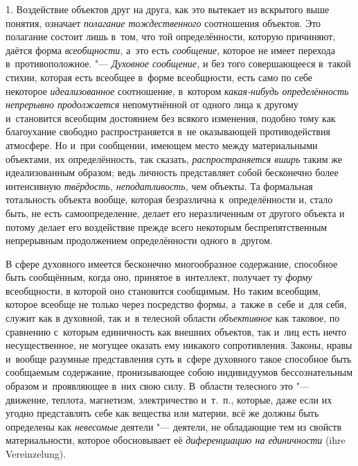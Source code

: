 1. Воздействие объектов друг на друга, как это вытекает из
вскрытого выше понятия, означает
{\em полагание тождественного}
соотношения объектов. Это полагание состоит лишь в~том, что
той определённости, которую
причиняют,
даётся форма
{\em всеобщности,} а~это
есть {\em сообщение,}
которое не имеет перехода в~противоположное. "---
{\em Духовное сообщение,}
и без того совершающееся в~такой стихии, которая есть
всеобщее в~форме всеобщности, есть само по себе некоторое
{\em идеализованное}
соотношение, в~котором
{\em какая-нибудь определённость
непрерывно продолжается} непомутнённой от одного лица к
другому и~становится всеобщим достоянием без всякого изменения, подобно
тому как благоухание свободно распространяется в~не оказывающей
противодействия атмосфере. Но и~при сообщении, имеющем место между
материальными объектами, их определённость, так сказать,
{\em распространяется вширь}
таким же идеализованным образом; ведь личность представляет
собой бесконечно более интенсивную
{\em твёрдость,}{\em
неподатливость,} чем объекты. Та формальная
тотальность объекта вообще, которая безразлична к~определённости и, стало
быть, не есть самоопределение, делает его неразличенным от другого объекта
и потому делает его воздействие прежде всего некоторым беспрепятственным
непрерывным продолжением определённости одного в~другом.

В сфере духовного имеется бесконечно многообразное содержание,
способное быть сообщённым, когда оно, принятое в~интеллект, получает ту
{\em форму} всеобщности,
в которой оно становится сообщимым. Но таким всеобщим, которое всеобще не
только через посредство формы, а~также в~себе и~для себя, служит как в
духовной, так и~в телесной области
{\em объективное} как
таковое, по сравнению с~которым единичность как внешних объектов, так и~лиц
есть нечто несущественное, не могущее оказать ему никакого сопротивления.
Законы, нравы и~вообще разумные представления суть в~сфере духовного такое
способное быть сообщаемым содержание, пронизывающее собою индивидуумов
бессознательным образом и~проявляющее в~них свою силу. В~области телесного
это "--- движение, теплота, магнетизм, электричество и~т.~п.,
которые, даже если их угодно представлять себе как вещества или материи,
всё же должны быть определены как
{\em невесомые} деятели
"--- деятели, не обладающие тем из свойств материальности,
которое обосновывает её
{\em диференциацию на единичности} (ihre Verein\-zelung).

